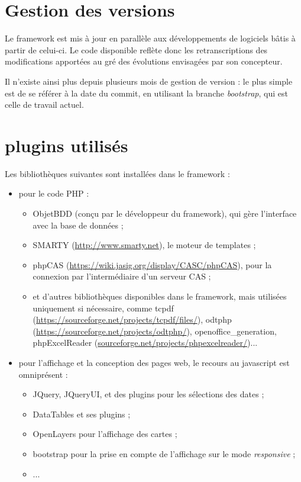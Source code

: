 \documentclass[12pt
,a4paper
,titlepage
,twoside
]{book}
\begin{document}
\section{Gestion des versions}

Le framework est mis à jour en parallèle aux développements de logiciels bâtis à partir de celui-ci. Le code disponible reflète donc les retranscriptions des modifications apportées au gré des évolutions envisagées par son concepteur.

Il n'existe ainsi plus depuis plusieurs mois de gestion de version : le plus simple est de se référer à la date du commit, en utilisant la branche \textit{bootstrap}, qui est celle de travail actuel.

\section{plugins utilisés}
Les bibliothèques suivantes sont installées dans le framework :
\begin{itemize}
\item pour le code PHP :
\begin{itemize}
\item ObjetBDD (conçu par le développeur du framework), qui gère l'interface avec la base de données ;
\item SMARTY (\url{http://www.smarty.net}), le moteur de templates ;
\item phpCAS (\url{https://wiki.jasig.org/display/CASC/phpCAS}), pour la connexion par l'intermédiaire d'un serveur CAS ;
\item et d'autres bibliothèques disponibles dans le framework, mais utilisées uniquement si nécessaire, comme tcpdf (\url{https://sourceforge.net/projects/tcpdf/files/}), odtphp (\url{https://sourceforge.net/projects/odtphp/}), openoffice\_generation, phpExcelReader (\url{sourceforge.net/projects/phpexcelreader/})...
\end{itemize}
\item pour l'affichage et la conception des pages web, le recours au javascript est omniprésent :
\begin{itemize}
\item JQuery, JQueryUI, et des plugins pour les sélections des dates ;
\item DataTables et ses plugins ;
\item OpenLayers pour l'affichage des cartes ;
\item bootstrap pour la prise en compte de l'affichage sur le mode \textit{responsive} ;
\item ...

\end{itemize}
\end{itemize}
\end{document}
